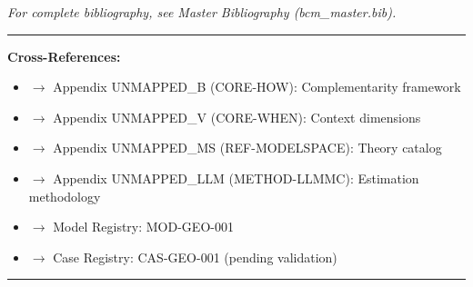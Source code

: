 \vspace{5mm}
\textit{For complete bibliography, see Master Bibliography (bcm\_master.bib).}

\nocite{bcm_master}



\vspace{10mm}
\hrule
\vspace{3mm}

\textbf{Cross-References:}
\begin{itemize}[nosep]
\item $\rightarrow$ Appendix UNMAPPED_B (CORE-HOW): Complementarity framework
\item $\rightarrow$ Appendix UNMAPPED_V (CORE-WHEN): Context dimensions
\item $\rightarrow$ Appendix UNMAPPED_MS (REF-MODELSPACE): Theory catalog
\item $\rightarrow$ Appendix UNMAPPED_LLM (METHOD-LLMMC): Estimation methodology
\item $\rightarrow$ Model Registry: MOD-GEO-001
\item $\rightarrow$ Case Registry: CAS-GEO-001 (pending validation)
\end{itemize}

\vspace{3mm}
\hrule


